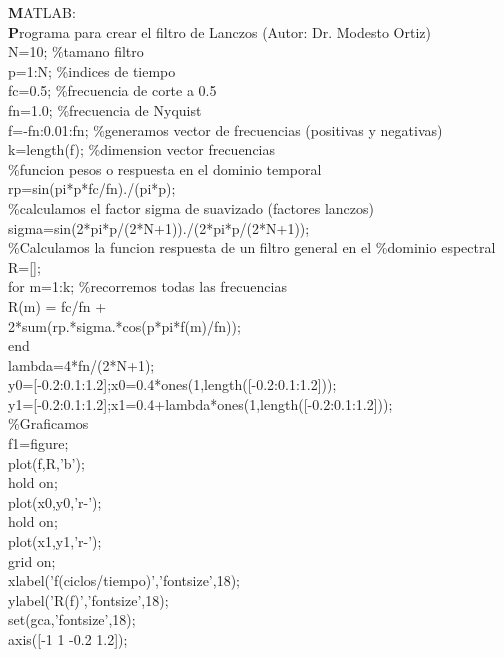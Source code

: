 \documentclass[
]{agujournal2019}
\begin{document}
\begin{framed}
{\noindent \textbf MATLAB:}\\
{\textbf Programa para crear el filtro de Lanczos (Autor: Dr. Modesto Ortiz)}\\
{\noindent}N=10;   \%tamano filtro\\
p=1:N;  \%indices de tiempo \\
fc=0.5; \%frecuencia de corte a 0.5\\
fn=1.0; \%frecuencia de Nyquist \\
f=-fn:0.01:fn; \%generamos vector de frecuencias (positivas y negativas)\\
k=length(f);   \%dimension vector frecuencias \\
\%funcion pesos o respuesta en el dominio temporal\\
rp=sin(pi*p*fc/fn)./(pi*p);\\
\%calculamos el factor sigma de suavizado (factores lanczos)\\
sigma=sin(2*pi*p/(2*N+1))./(2*pi*p/(2*N+1)); \\
\%Calculamos la funcion respuesta de un filtro general en el
\%dominio espectral\\
R=[];\\
for m=1:k; \%recorremos todas las frecuencias\\
    R(m) = fc/fn + \\
    2*sum(rp.*sigma.*cos(p*pi*f(m)/fn));\\
end\\
lambda=4*fn/(2*N+1);\\
y0=[-0.2:0.1:1.2];x0=0.4*ones(1,length([-0.2:0.1:1.2]));\\
y1=[-0.2:0.1:1.2];x1=0.4+lambda*ones(1,length([-0.2:0.1:1.2]));\\
\%Graficamos\\
f1=figure;\\
plot(f,R,'b'); \\
hold on;\\
plot(x0,y0,'r-');\\
hold on;\\
plot(x1,y1,'r-');\\
grid on;\\
xlabel('f(ciclos/tiempo)','fontsize',18);\\
ylabel('R(f)','fontsize',18);\\
set(gca,'fontsize',18);\\
axis([-1 1 -0.2 1.2]);\\
\end{framed}
\end{document}

